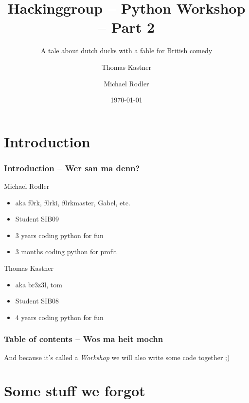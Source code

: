 \documentclass{beamer}
\title[Python Workshop]{Hackinggroup -- Python Workshop -- Part 2}
\subtitle{A tale about dutch ducks with a fable for British comedy}
\author[Thomas Kastner, Michael Rodler]{Thomas Kastner\and Michael Rodler}
\date{\today}
\begin{document}
\begin{frame}
    \titlepage
\end{frame}

\section*{Introduction}

\begin{frame}
    \frametitle{Introduction -- Wer san ma denn?}

    \begin{block}{Michael Rodler}
    \begin{itemize}
        \item aka f0rk, f0rki, f0rkmaster, Gabel, etc.
        \item Student SIB09
        \item 3 years coding python for fun
        \item 3 months coding python for profit
    \end{itemize}
    \end{block}

    \begin{block}{Thomas Kastner}
    \begin{itemize}
        \item aka br3z3l, tom
        \item Student SIB08
        \item 4 years coding python for fun
    \end{itemize}
    \end{block}
\end{frame}


\begin{frame}[fragile]
    \frametitle{Table of contents -- Wos ma heit mochn}
    \tableofcontents
    And because it's called a \emph{Workshop} we will also write some code together ;)
\end{frame}

\section{Some stuff we forgot}	%
\end{document}
